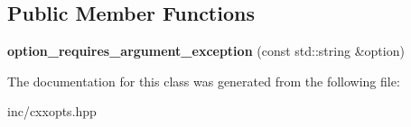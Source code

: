 \subsection*{Public Member Functions}
\begin{DoxyCompactItemize}
\item 
{\bfseries option\+\_\+requires\+\_\+argument\+\_\+exception} (const std\+::string \&option)\hypertarget{classcxxopts_1_1option__requires__argument__exception_a4dd16f0718fc2952cf0e632d757800b0}{}\label{classcxxopts_1_1option__requires__argument__exception_a4dd16f0718fc2952cf0e632d757800b0}

\end{DoxyCompactItemize}


The documentation for this class was generated from the following file\+:\begin{DoxyCompactItemize}
\item 
inc/cxxopts.\+hpp\end{DoxyCompactItemize}

